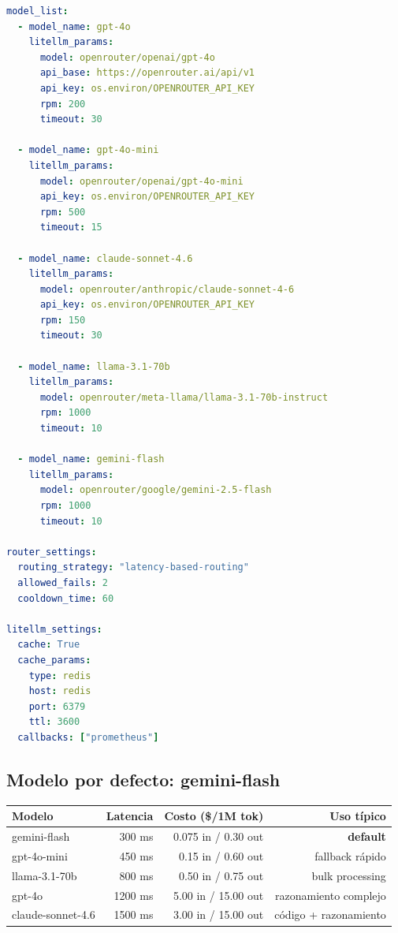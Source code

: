 \documentclass[11pt,a4paper]{article}
\begin{document}
\begin{lstlisting}[language=yaml]
model_list:
  - model_name: gpt-4o
    litellm_params:
      model: openrouter/openai/gpt-4o
      api_base: https://openrouter.ai/api/v1
      api_key: os.environ/OPENROUTER_API_KEY
      rpm: 200
      timeout: 30

  - model_name: gpt-4o-mini
    litellm_params:
      model: openrouter/openai/gpt-4o-mini
      api_key: os.environ/OPENROUTER_API_KEY
      rpm: 500
      timeout: 15

  - model_name: claude-sonnet-4.6
    litellm_params:
      model: openrouter/anthropic/claude-sonnet-4-6
      api_key: os.environ/OPENROUTER_API_KEY
      rpm: 150
      timeout: 30

  - model_name: llama-3.1-70b
    litellm_params:
      model: openrouter/meta-llama/llama-3.1-70b-instruct
      rpm: 1000
      timeout: 10

  - model_name: gemini-flash
    litellm_params:
      model: openrouter/google/gemini-2.5-flash
      rpm: 1000
      timeout: 10

router_settings:
  routing_strategy: "latency-based-routing"
  allowed_fails: 2
  cooldown_time: 60

litellm_settings:
  cache: True
  cache_params:
    type: redis
    host: redis
    port: 6379
    ttl: 3600
  callbacks: ["prometheus"]
\end{lstlisting}

\subsection{Modelo por defecto: gemini-flash}

\begin{center}
\begin{tabular}{|l|r|r|r|}
\hline
\rowcolor{hermesblue}\color{white}\textbf{Modelo} & \color{white}\textbf{Latencia} & \color{white}\textbf{Costo (\$/1M tok)} & \color{white}\textbf{Uso típico}\\
\hline
gemini-flash & ~300 ms & 0.075 in / 0.30 out & \textbf{default}\\
gpt-4o-mini & ~450 ms & 0.15 in / 0.60 out & fallback rápido\\
llama-3.1-70b & ~800 ms & 0.50 in / 0.75 out & bulk processing\\
gpt-4o & ~1200 ms & 5.00 in / 15.00 out & razonamiento complejo\\
claude-sonnet-4.6 & ~1500 ms & 3.00 in / 15.00 out & código + razonamiento\\
\hline
\end{tabular}
\end{center}
\end{document}
